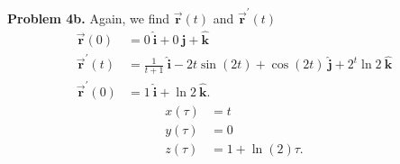 \documentclass{report}
\begin{document}
    \bigbreak \noindent 
    \textbf{Problem 4b.} Again, we find $\vec{\mathbf{r}}(t)$ and $\vec{\mathbf{r}}^{\prime}(t)$
    \begin{align*}
        \vec{\mathbf{r}}\left(0\right) &= 0\ \hat{\mathbf{i}} + 0\ \hat{\mathbf{j}} + \hat{\mathbf{k}} \\
        \vec{\mathbf{r}}^{\prime}(t) &= \frac{1}{t+1}\ \hat{\mathbf{i}} -2t\sin{\left(2t\right)} + \cos{\left(2t\right)}\ \hat{\mathbf{j}} + 2^{t}\ln{2}\ \hat{\mathbf{k}} \\
        \vec{\mathbf{r}}^{\prime}(0) &= 1\ \hat{\mathbf{i}} + \ln{2}\ \hat{\mathbf{k}}
    .\end{align*}
    \begin{align*}
        x(\tau) &= t \\
        y(\tau) &=0 \\
        z(\tau) &=1 +\ln{(2)}\tau
    .\end{align*}
\end{document}
